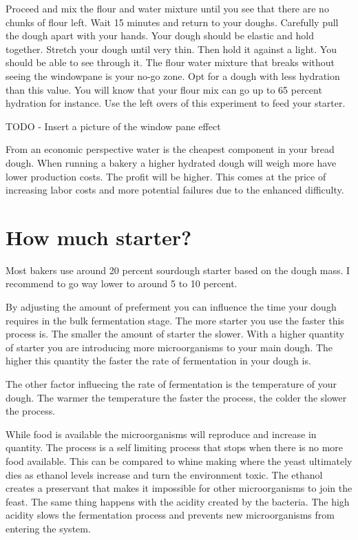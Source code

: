 Proceed and mix the flour and water mixture until you see that there
are no chunks of flour left. Wait 15 minutes and return to your doughs.
Carefully pull the dough apart with your hands. Your dough should be elastic
and hold together. Stretch your dough until very thin. Then hold it against a light.
You should be able to see through it. The flour water mixture that breaks without
seeing the windowpane is your no-go zone. Opt for a dough with
less hydration than this value. You will know that your flour mix can go up to
65 percent hydration for instance. Use the left overs of this experiment
to feed your starter.

TODO - Insert a picture of the window pane effect

From an economic perspective water is the cheapest component in your bread
dough. When running a bakery a higher hydrated dough will weigh more have
lower production costs. The profit will be higher. This comes at the price
of increasing labor costs and more potential failures due to the enhanced
difficulty.

\section{How much starter?}

Most bakers use around 20 percent sourdough starter based on the dough mass. I
recommend to go way lower to around 5 to 10 percent.

By adjusting the amount of preferment you can influence the time your dough
requires in the bulk fermentation stage. The more starter you use the faster
this process is. The smaller the amount of starter the slower. With a higher
quantity of starter you are introducing more microorganisms to your main
dough. The higher this quantity the faster the rate of fermentation in your
dough is.

The other factor influecing the rate of fermentation is the temperature of
your dough. The warmer the temperature the faster the process, the colder the
slower the process.

While food is available the microorganisms will reproduce and increase in
quantity. The process is a self limiting process that stops when there is no
more food available. This can be compared to whine making where
the yeast ultimately dies as ethanol levels increase and turn the environment
toxic. The ethanol creates a preservant that makes it impossible for other
microorganisms to join the feast. The same thing happens with the acidity
created by the bacteria. The high acidity slows the fermentation process and
prevents new microorganisms from entering the system.

